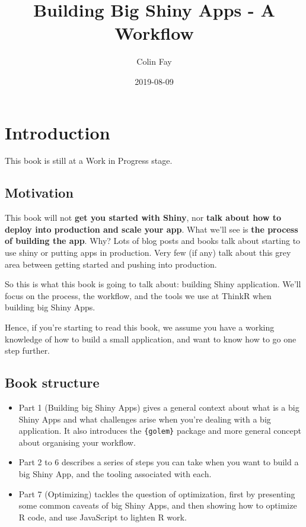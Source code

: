 \documentclass[]{book}
\title{Building Big Shiny Apps - A Workflow}
\author{Colin Fay}
\date{2019-08-09}
\begin{document}
\maketitle

{
\setcounter{tocdepth}{1}
\tableofcontents
}
\hypertarget{introduction}{%
\chapter*{Introduction}\label{introduction}}

This book is still at a Work in Progress stage.

\hypertarget{motivation}{%
\section*{Motivation}\label{motivation}}

This book will not \textbf{get you started with Shiny}, nor \textbf{talk about how to deploy into production and scale your app}. What we'll see is \textbf{the process of building the app}. Why? Lots of blog posts and books talk about starting to use shiny or putting apps in production. Very few (if any) talk about this grey area between getting started and pushing into production.

So this is what this book is going to talk about: building Shiny application. We'll focus on the process, the workflow, and the tools we use at ThinkR when building big Shiny Apps.

Hence, if you're starting to read this book, we assume you have a working knowledge of how to build a small application, and want to know how to go one step further.

\hypertarget{book-structure}{%
\section*{Book structure}\label{book-structure}}

\begin{itemize}
\item
  Part 1 (Building big Shiny Apps) gives a general context about what is a big Shiny Apps and what challenges arise when you're dealing with a big application. It also introduces the \texttt{\{golem\}} package and more general concept about organising your workflow.
\item
  Part 2 to 6 describes a series of steps you can take when you want to build a big Shiny App, and the tooling associated with each.
\item
  Part 7 (Optimizing) tackles the question of optimization, first by presenting some common caveats of big Shiny Apps, and then showing how to optimize R code, and use JavaScript to lighten R work.
\end{itemize}
\end{document}
